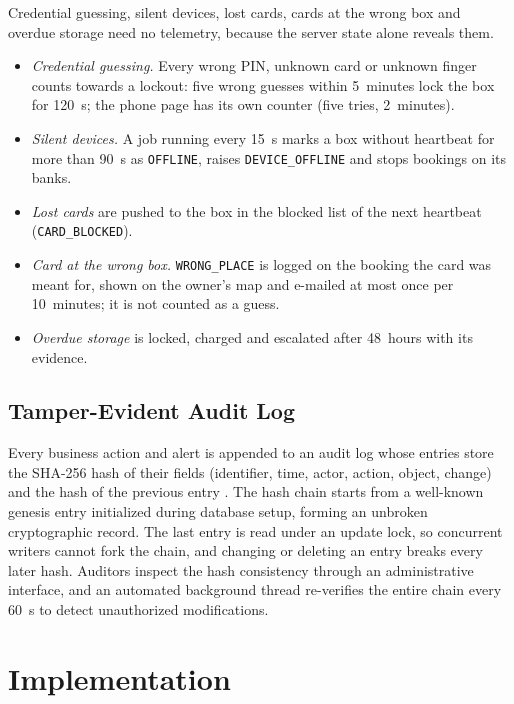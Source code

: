 Credential guessing, silent devices, lost cards, cards at the wrong box and overdue storage need no telemetry, because
the server state alone reveals them.
\begin{itemize}
  \item \textit{Credential guessing.} Every wrong PIN, unknown card or unknown finger counts towards a lockout: five
        wrong guesses within 5~minutes lock the box for 120~s; the phone page has its own counter (five tries,
        2~minutes).
  \item \textit{Silent devices.} A job running every 15~s marks a box without heartbeat for more than 90~s as
        \texttt{OFFLINE}, raises \texttt{DEVICE\_OFFLINE} and stops bookings on its banks.
  \item \textit{Lost cards} are pushed to the box in the blocked list of the next heartbeat (\texttt{CARD\_BLOCKED}).
  \item \textit{Card at the wrong box.} \texttt{WRONG\_PLACE} is logged on the booking the card was meant for, shown
        on the owner's map and e-mailed at most once per 10~minutes; it is not counted as a guess.
  \item \textit{Overdue storage} is locked, charged and escalated after 48~hours with its evidence.
\end{itemize}

\subsection{Tamper-Evident Audit Log}

Every business action and alert is appended to an audit log whose entries store the SHA-256 hash of their fields
(identifier, time, actor, action, object, change) and the hash of the previous entry \cite{haber1991timestamp}. The
hash chain starts from a well-known genesis entry initialized during database setup, forming an unbroken cryptographic
record. The last entry is read under an update lock, so concurrent writers cannot fork the chain, and changing or
deleting an entry breaks every later hash. Auditors inspect the hash consistency through an administrative interface,
and an automated background thread re-verifies the entire chain every 60~s to detect unauthorized modifications.

\section{Implementation}

